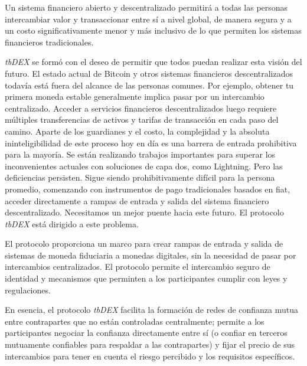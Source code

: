 \documentclass[11pt]{article}
\begin{document}
\vspace{1\baselineskip}
Un sistema financiero abierto y descentralizado permitirá a todas las personas intercambiar valor y transaccionar entre sí a nivel global, de manera segura y a un costo significativamente menor y más inclusivo de lo que permiten los sistemas financieros tradicionales.

\vspace{1\baselineskip}
\textit{tbDEX} se formó con el deseo de permitir que todos puedan realizar esta visión del futuro. El estado actual de Bitcoin y otros sistemas financieros descentralizados todavía está fuera del alcance de las personas comunes. Por ejemplo, obtener tu primera moneda estable generalmente implica pasar por un intercambio centralizado. Acceder a servicios financieros descentralizados luego requiere múltiples transferencias de activos y tarifas de transacción en cada paso del camino. Aparte de los guardianes y el costo, la complejidad y la absoluta ininteligibilidad de este proceso hoy en día es una barrera de entrada prohibitiva para la mayoría. Se están realizando trabajos importantes para superar los inconvenientes actuales con soluciones de capa dos, como Lightning. Pero las deficiencias persisten. Sigue siendo prohibitivamente difícil para la persona promedio, comenzando con instrumentos de pago tradicionales basados en fiat, acceder directamente a rampas de entrada y salida del sistema financiero descentralizado. Necesitamos un mejor puente hacia este futuro. El protocolo \textit{tbDEX} está dirigido a este problema.


\vspace{1\baselineskip}
El protocolo proporciona un marco para crear rampas de entrada y salida de sistemas de moneda fiduciaria a monedas digitales, sin la necesidad de pasar por intercambios centralizados. El protocolo permite el intercambio seguro de identidad y mecanismos que perminten a los participantes cumplir con leyes y regulaciones. 

\vspace{1\baselineskip}
En esencia, el protocolo \textit{tbDEX} facilita la formación de redes de confianza mutua entre contrapartes que no están controladas centralmente; permite a los participantes negociar la confianza directamente entre sí (o confiar en terceros mutuamente confiables para respaldar a las contrapartes) y fijar el precio de sus intercambios para tener en cuenta el riesgo percibido y los requisitos específicos. 

\vspace{1\baselineskip}
\end{document}
